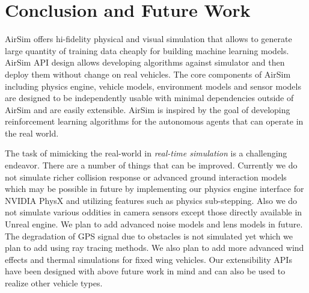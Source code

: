 \documentclass[graybox]{svmult}
\begin{document}

\section{Conclusion and Future Work}
AirSim offers hi-fidelity physical and visual simulation that allows to generate large quantity of training data cheaply for building machine learning models. AirSim API design allows developing algorithms against simulator and then deploy them without change on real vehicles. The core components of AirSim including physics engine, vehicle models, environment models and sensor models are designed to be independently usable with minimal dependencies outside of AirSim and are easily extensible. AirSim is inspired by the goal of developing reinforcement learning algorithms for the autonomous agents that can operate in the real world.

The task of mimicking the real-world in \emph{real-time simulation} is a challenging endeavor. There are a number of things that can be improved. Currently we do not simulate richer collision response or advanced ground interaction models which may be possible in future by implementing our physics engine interface for NVIDIA PhysX and utilizing features such as physics sub-stepping. Also we do not simulate various oddities in camera sensors except those directly available in Unreal engine. We plan to add advanced noise models and lens models in future. The degradation of GPS signal due to obstacles is not simulated yet which we plan to add using ray tracing methods. We also plan to add more advanced wind effects and thermal simulations for fixed wing vehicles. Our extensibility APIs have been designed with above future work in mind and can also be used to realize other vehicle types.


{\footnotesize 
 }
\end{document}
